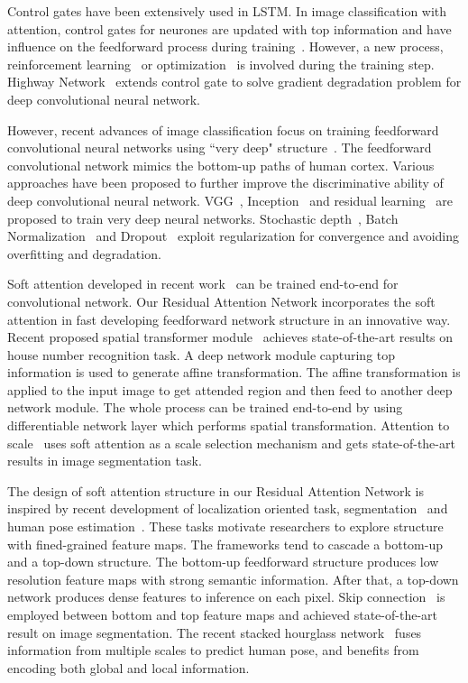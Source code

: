 \documentclass[10pt,twocolumn,letterpaper]{article}
\begin{document}
Control gates have been extensively used in LSTM.  In image classification with attention, control gates for neurones are updated with top information and have influence on the feedforward process during training~\cite{cao2015look,stollenga2014deep}. However, a new process, reinforcement learning~\cite{stollenga2014deep} or optimization~\cite{cao2015look} is involved during the training step. Highway Network~\cite{srivastava2015training} extends control gate to solve gradient degradation problem for deep convolutional neural network.

However, recent advances of image classification focus on training feedforward convolutional neural networks using ``very deep" structure~\cite{simonyan2014very,szegedy2015going,resnet2016}. The feedforward convolutional network mimics the bottom-up paths of human cortex. Various approaches have been proposed to further improve the discriminative ability of deep convolutional neural network. VGG~\cite{simonyan2014very}, Inception~\cite{szegedy2015going} and residual learning~\cite{resnet2016} are proposed to train very deep neural networks. Stochastic depth~\cite{huang2016deep}, Batch Normalization~\cite{BN2015} and Dropout~\cite{dropout2014} exploit regularization for convergence and avoiding overfitting and degradation.

Soft attention developed in recent work~\cite{chen2015attention, jaderberg2015spatial} can be trained end-to-end for convolutional network. Our Residual Attention Network incorporates the soft attention in fast developing feedforward network structure in an innovative way. Recent proposed spatial transformer module~\cite{jaderberg2015spatial} achieves state-of-the-art results on house number recognition task. A deep network module capturing top information is used to generate affine transformation. The affine transformation is applied to the input image to get attended region and then feed to another deep network module. The whole process can be trained end-to-end by using differentiable network layer which performs spatial transformation. Attention to scale~\cite{chen2015attention} uses soft attention as a scale selection mechanism and gets state-of-the-art results in image segmentation task.


The design of soft attention structure in our Residual Attention Network is inspired by recent development of localization oriented task, \ie segmentation~\cite{long2015fully,noh2015learning,badrinarayanan2015segnet} and human pose estimation~\cite{newell2016stacked}. These tasks motivate researchers to explore structure with fined-grained feature maps. The frameworks tend to cascade a bottom-up and a top-down structure. The bottom-up feedforward structure produces low resolution feature maps with strong semantic information. After that, a top-down network produces dense features to inference on each pixel. Skip connection~\cite{long2015fully} is employed between bottom and top feature maps and achieved state-of-the-art result on image segmentation. The recent stacked hourglass network~\cite{newell2016stacked} fuses information from multiple scales to predict human pose, and benefits from encoding both global and local information.
\end{document}

